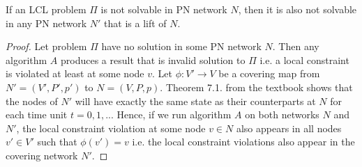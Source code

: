 \begin{lemma} \label{lem:lcl_unsolvability:from_multiple_to_lift}
If an LCL problem $\Pi$ is not solvable in PN network $N$, then it is also not solvable in any PN network $N'$ that is a lift of $N$.
\end{lemma}
\begin{proof}
    Let problem $\Pi$ have no solution in some PN network $N$.
    Then any algorithm $A$ produces a result that is invalid solution to $\Pi$ i.e. a local constraint is violated at least at some node $v$.
    Let $\phi: V' \rightarrow V$ be a covering map from $N'=(V', P', p')$ to $N=(V, P, p)$.
    Theorem 7.1. from the textbook \cite{HirvonenSuomelaDistAlg2020} shows that the nodes of $N'$ will have exactly the same state as their counterparts at $N$ for each time unit $t=0,1,...$
    Hence, if we run algorithm $A$ on both networks $N$ and $N'$, the local constraint violation at some node $v \in N$ also appears in all nodes $v' \in V'$ such that $\phi(v') = v$ i.e. the local constraint violations also appear in the covering network $N'$.
\end{proof}

